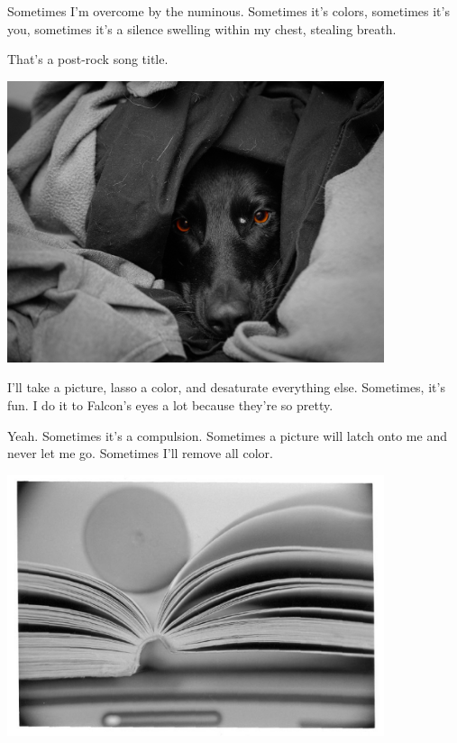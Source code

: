 \begin{paracol}{2}
\begin{leftcolumn}
Sometimes I'm overcome by the numinous. Sometimes it's colors, sometimes it's you, sometimes it's a silence swelling within my chest, stealing breath.


That's a post-rock song title.


\noindent\includegraphics[width=4.35in]{../static/color/orange_eyes.jpg}

I'll take a picture, lasso a color, and desaturate everything else. Sometimes, it's fun. I do it to Falcon's eyes a lot because they're so pretty.


Yeah. Sometimes it's a compulsion. Sometimes a picture will latch onto me and never let me go. Sometimes I'll remove all color.


\noindent\includegraphics[width=4.35in]{../static/color/bw1.jpg}


\end{leftcolumn}
\end{paracol}
